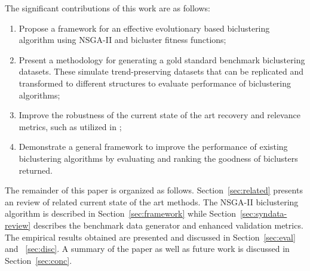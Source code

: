 The significant contributions of this work are as follows:
\begin{enumerate}
    \item Propose a framework for an effective evolutionary based biclustering algorithm using NSGA-II and bicluster fitness functions;
    \item Present a methodology for generating a gold standard benchmark biclustering datasets. These simulate trend-preserving datasets that can be replicated and transformed to different structures to evaluate performance of biclustering algorithms;
    \item Improve the robustness of the current state of the art recovery and relevance metrics, such as utilized in \cite{wang2016unibic}; 
    \item Demonstrate a general framework to improve the performance of existing biclustering algorithms by evaluating and ranking the goodness of biclusters returned.
\end{enumerate}

The remainder of this paper is organized as follows. Section~\ref{sec:related} presents an review of related current state of the art methods. The NSGA-II biclustering algorithm is described in Section~\ref{sec:framework} while Section~\ref{sec:syndata-review} describes the benchmark data generator and enhanced validation metrics. The empirical results obtained are presented and discussed in Section~\ref{sec:eval} and ~\ref{sec:disc}. A summary of the paper as well as future work is discussed in Section~\ref{sec:conc}.




